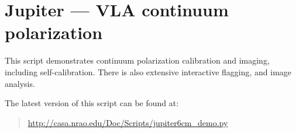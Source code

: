 \normalsize

\section{Jupiter --- VLA continuum polarization}
\label{section:scripts.jupiter}

This script demonstrates continuum polarization calibration and
imaging, including self-calibration.  There is also extensive
interactive flagging, and image analysis.

The latest version of this script can be found at:
\begin{quote}
   \url{http://casa.nrao.edu/Doc/Scripts/jupiter6cm_demo.py}
\end{quote}

